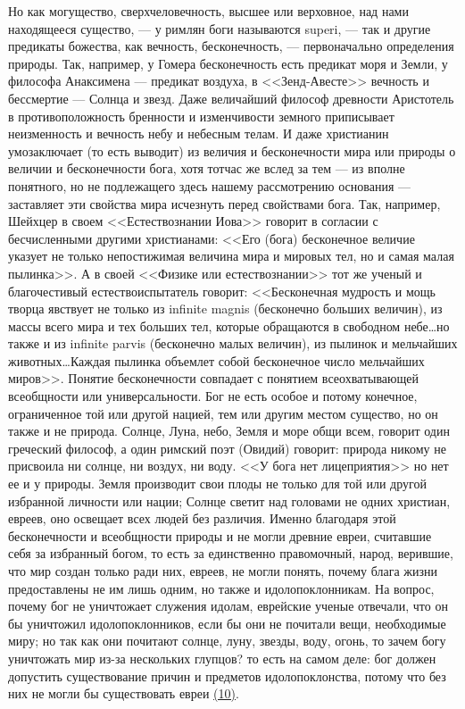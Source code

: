 \documentclass[12pt]{article}
\begin{document}
Но как могущество, сверхчеловечность, высшее или верховное, над нами находящееся существо, --- у римлян боги называются superi, --- так и другие предикаты божества, как вечность, бесконечность, --- первоначально определения природы. Так, например, у Гомера бесконечность есть предикат моря и Земли, у философа Анаксимена --- предикат воздуха, в <<Зенд-Авесте>> вечность и бессмертие --- Солнца и звезд. Даже величайший философ древности Аристотель в противоположность бренности и изменчивости земного приписывает неизменность и вечность небу и небесным телам. И даже христианин умозаключает (то есть выводит) из величия и бесконечности мира или природы о величии и бесконечности бога, хотя тотчас же вслед за тем --- из вполне понятного, но не подлежащего здесь нашему рассмотрению основания --- заставляет эти свойства мира исчезнуть перед свойствами бога. Так, например, Шейхцер в своем <<Естествознании Иова>> говорит в согласии с бесчисленными другими христианами: <<Его (бога) бесконечное величие указует не только непостижимая величина мира и мировых тел, но и самая малая пылинка>>. А в своей <<Физике или естествознании>> тот же ученый и благочестивый естествоиспытатель говорит: <<Бесконечная мудрость и мощь творца явствует не только из infinite magnis (бесконечно больших величин), из массы всего мира и тех больших тел, которые обращаются в свободном небе\dots но также и из infinite parvis (бесконечно малых величин), из пылинок и мельчайших животных\dots Каждая пылинка объемлет собой бесконечное число мельчайших миров>>. Понятие бесконечности совпадает с понятием всеохватывающей всеобщности или универсальности. Бог не есть особое и потому конечное, ограниченное той или другой нацией, тем или другим местом существо, но он также и не природа. Солнце, Луна, небо, Земля и море общи всем, говорит один греческий философ, а один римский поэт (Овидий) говорит: природа никому не присвоила ни солнце, ни воздух, ни воду. <<У бога нет лицеприятия>>  но нет ее и у природы. Земля производит свои плоды не только для той или другой избранной личности или нации; Солнце светит над головами не одних христиан, евреев, оно освещает всех людей без различия. Именно благодаря этой бесконечности и всеобщности природы и не могли древние евреи, считавшие себя за избранный богом, то есть за единственно правомочный, народ, верившие, что мир создан только ради них, евреев, не могли понять, почему блага жизни предоставлены не им лишь одним, но также и идолопоклонникам. На вопрос, почему бог не уничтожает служения идолам, еврейские ученые отвечали, что он бы уничтожил идолопоклонников, если бы они не почитали вещи, необходимые миру; но так как они почитают солнце, луну, звезды, воду, огонь, то зачем богу уничтожать мир из-за нескольких глупцов? то есть на самом деле: бог должен допустить существование причин и предметов идолопоклонства, потому что без них не могли бы существовать евреи \hyperlink{10}{(10)}\hypertarget{b10}{}. 
\end{document}
